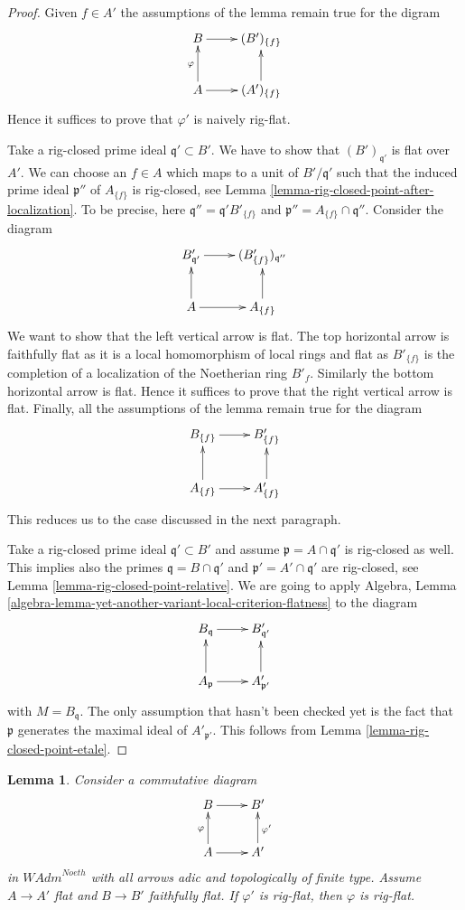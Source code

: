 \documentclass{stacks-project}
\theoremstyle{plain}
\newtheorem{lemma}[subsection]{Lemma}
\theoremstyle{definition}
\theoremstyle{remark}
\numberwithin{equation}{subsection}
\begin{document}
\begin{proof}
Given $f \in A'$ the assumptions of the lemma remain true for the digram
$$
\xymatrix{
B \ar[r] & (B')_{\{f\}} \\
A \ar[r] \ar[u]^\varphi & (A')_{\{f\}} \ar[u]
}
$$
Hence it suffices to prove that $\varphi'$ is naively rig-flat.

\medskip\noindent
Take a rig-closed prime ideal $\mathfrak q' \subset B'$.
We have to show that $(B')_{\mathfrak q'}$ is flat over $A'$.
We can choose an $f \in A$ which maps to a unit of $B'/\mathfrak q'$
such that the induced prime ideal $\mathfrak p''$ of $A_{\{f\}}$ 
is rig-closed, see Lemma \ref{lemma-rig-closed-point-after-localization}.
To be precise, here $\mathfrak q'' = \mathfrak q' B'_{\{f\}}$ and
$\mathfrak p'' = A_{\{f\}} \cap \mathfrak q''$.
Consider the diagram
$$
\xymatrix{
B'_{\mathfrak q'} \ar[r] &
(B'_{\{f\}})_{\mathfrak q''} \\
A \ar[r] \ar[u] &
A_{\{f\}} \ar[u]
}
$$
We want to show that the left vertical arrow is flat.
The top horizontal arrow is faithfully flat as it is a local
homomorphism of local rings and flat as $B'_{\{f\}}$
is the completion of a localization of the Noetherian ring
$B'_f$. Similarly the bottom horizontal arrow is flat.
Hence it suffices to prove that the right vertical arrow is flat.
Finally, all the assumptions of the lemma remain true for the diagram
$$
\xymatrix{
B_{\{f\}} \ar[r] &
B'_{\{f\}} \\
A_{\{f\}} \ar[r] \ar[u] &
A'_{\{f\}} \ar[u]
}
$$
This reduces us to the case discussed in the next paragraph.

\medskip\noindent
Take a rig-closed prime ideal $\mathfrak q' \subset B'$
and assume $\mathfrak p = A \cap \mathfrak q'$ is rig-closed as well.
This implies also the primes $\mathfrak q = B \cap \mathfrak q'$
and $\mathfrak p' = A' \cap \mathfrak q'$ are rig-closed, see
Lemma \ref{lemma-rig-closed-point-relative}.
We are going to apply
Algebra, Lemma \ref{algebra-lemma-yet-another-variant-local-criterion-flatness}
to the diagram
$$
\xymatrix{
B_\mathfrak q \ar[r] &
B'_{\mathfrak q'} \\
A_\mathfrak p \ar[u] \ar[r] &
A'_{\mathfrak p'} \ar[u]
}
$$
with $M = B_\mathfrak q$. The only assumption that hasn't been checked yet
is the fact that $\mathfrak p$ generates the maximal ideal of
$A'_{\mathfrak p'}$. This follows from
Lemma \ref{lemma-rig-closed-point-etale}.
\end{proof}

\begin{lemma}
\label{lemma-rig-flat-local-down}
Consider a commutative diagram
$$
\xymatrix{
B \ar[r] & B' \\
A \ar[r] \ar[u]^\varphi & A' \ar[u]_{\varphi'}
}
$$
in $\textit{WAdm}^{Noeth}$ with all arrows adic and topologically
of finite type. Assume $A \to A'$ flat and $B \to B'$ faithfully flat.
If $\varphi'$ is rig-flat, then $\varphi$ is rig-flat.
\end{lemma}
\end{document}
